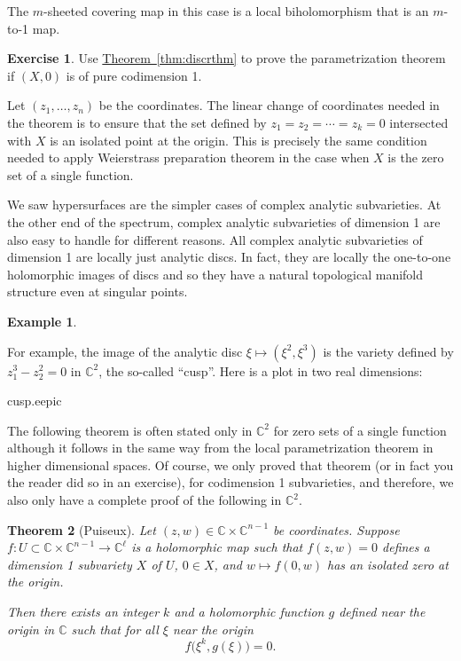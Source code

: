 \documentclass[12pt,openany]{book}
\newcommand{\C}{{\mathbb{C}}}
\newcommand{\myindex}[1]{#1\index{#1}}
\theoremstyle{plain}
\newtheorem{thm}{Theorem}[section]
\theoremstyle{remark}
\theoremstyle{definition}
\newenvironment{exbox}{%
    \def\FrameCommand{\vrule width 1pt \relax\hspace {10pt}}%
    \MakeFramed {\advance \hsize -\width \FrameRestore }%
}{%
    \endMakeFramed
}
\theoremstyle{exercise}
\newtheorem{exercise}{Exercise}[section]
\theoremstyle{example}
\newtheorem{example}[thm]{Example}
\newcommand{\thmref}[1]{\hyperref[#1]{Theorem~\ref*{#1}}}
\begin{document}
The $m$-sheeted covering map in this case is a local biholomorphism
that is an $m$-to-1 map.

\begin{exbox}
\begin{exercise}
Use \thmref{thm:discrthm}
to prove the parametrization theorem if $(X,0)$ is
of pure codimension 1.
\end{exercise}
\end{exbox}

Let $(z_1,\ldots,z_n)$ be the coordinates.
The linear change of coordinates needed in the theorem is
to ensure that the set defined by $z_1=z_2=\cdots=z_k = 0$ intersected
with $X$ is an isolated point at the origin.  This is precisely
the same condition needed to apply Weierstrass preparation theorem in the case
when $X$ is the zero set of a single function.

We saw hypersurfaces are the simpler cases of complex analytic
subvarieties.  At the other end of the spectrum, complex analytic
subvarieties of dimension 1 are also easy to handle for different reasons.
All complex
analytic subvarieties of dimension 1 are locally just analytic discs.
In fact, they are locally the one-to-one holomorphic images of discs
and so they have a natural topological manifold structure even at singular
points.

\begin{example}
\begin{samepage}
For example, the image of the analytic disc
$\xi \mapsto (\xi^2,\xi^3)$ is the variety
defined by $z_1^3-z_2^2 = 0$ in $\C^2$, the so-called ``cusp''.  Here is a
plot in two real dimensions:

\nopagebreak
\begin{center}
\medskip
{cusp.eepic}
\bigskip
\end{center}
\end{samepage}
\end{example}


The following theorem is often stated only in $\C^2$ for zero sets of
a single function although it follows in
the same way from the local parametrization theorem in higher dimensional
spaces.  Of course, we only
proved that theorem (or in fact you the reader did so in an exercise), for
codimension 1 subvarieties, and therefore, we also only have a complete
proof of the following in $\C^2$.

\begin{thm}[\myindex{Puiseux}]
Let $(z,w) \in \C \times \C^{n-1}$ be coordinates.
Suppose $f \colon U \subset \C \times \C^{n-1} \to \C^\ell$
is a holomorphic map such that
$f(z,w) = 0$ defines a dimension 1 subvariety $X$ of $U$,
$0 \in X$,
and $w \mapsto f(0,w)$ has an isolated zero at the origin.

Then there exists an integer $k$ and a holomorphic function $g$ defined near
the origin in $\C$ such that
for all $\xi$ near the origin
\begin{equation*}
f\bigl(\xi^k,g(\xi)\bigr) = 0 .
\end{equation*}
\end{thm}
\end{document}
